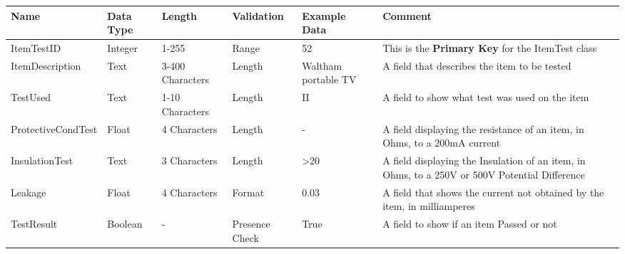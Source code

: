 \begin{landscape}
    \begin{center}
        \begin{tabular}{|p{3.4cm}|p{2cm}|p{2cm}|p{2cm}|p{4cm}|p{5cm}|}
            \hline
            \textbf{Name} & \textbf{Data Type} & \textbf{Length} & \textbf{Validation} & \textbf{Example Data} & \textbf{Comment} \\ \hline
            ItemTestID         & Integer & 1-255            & Range          & 52                  & This is the \textbf{Primary Key} for the ItemTest class \\ \hline
            ItemDescription    & Text    & 3-400 Characters & Length         & Waltham portable TV & A field that describes the item to be tested \\ \hline
            TestUsed           & Text    & 1-10 Characters  & Length         & II                  & A field to show what test was used on the item \\ \hline
            ProtectiveCondTest & Float   & 4 Characters     & Length         & -                   & A field displaying the resistance of an item, in Ohms, to a 200mA 
                                                                                                     current  \\ \hline
            InsulationTest     & Text    & 3 Characters     & Length         & >20                 & A field displaying the Insulation of an item, in Ohms, to a 250V or 
                                                                                                     500V Potential Difference \\ \hline
            Leakage            & Float   & 4 Characters     & Format         & 0.03                & A field that shows the current not obtained by the item, in 
                                                                                                     milliamperes \\ \hline
            TestResult         & Boolean & -                & Presence Check & True & A field to show if an item Passed or not\\ \hline
        \end{tabular}
    \end{center}
\end{landscape}

